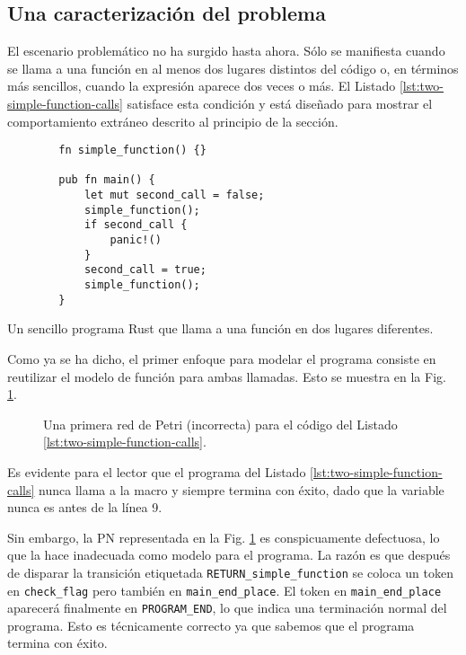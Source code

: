 \subsection{Una caracterización del problema}

El escenario problemático no ha surgido hasta ahora. Sólo se manifiesta cuando se llama a una
función en al menos dos lugares distintos del código o, en términos más sencillos, cuando la
expresión  aparece dos veces o más.
El Listado \ref{lst:two-simple-function-calls} satisface esta condición y
está diseñado para mostrar el comportamiento extráneo descrito al principio de la sección.

\begin{listing}[!htb]
    \begin{verbatim}
        fn simple_function() {}

        pub fn main() {
            let mut second_call = false;
            simple_function();
            if second_call {
                panic!()
            }
            second_call = true;
            simple_function();
        }
    \end{verbatim}
    \caption{Un sencillo programa Rust que llama a una función en dos lugares diferentes.}
    \label{lst:two-simple-function-calls}
\end{listing}

Como ya se ha dicho, el primer enfoque para modelar el programa consiste en reutilizar el
modelo de función para ambas llamadas. Esto se muestra en la Fig. \ref{fig:two-function-calls-incorrect-1}.

\begin{figure}[!htbp]
    \centering
    
    \caption{Una primera red de Petri (incorrecta) para el código del Listado \ref{lst:two-simple-function-calls}.}
    \label{fig:two-function-calls-incorrect-1}
\end{figure}

Es evidente para el lector que el programa del Listado \ref{lst:two-simple-function-calls}
nunca llama a la macro  y siempre termina con éxito,
dado que la variable  nunca es  antes de la línea 9.

Sin embargo, la \acrshort{PN} representada en la Fig. \ref{fig:two-function-calls-incorrect-1} es conspicuamente defectuosa,
lo que la hace inadecuada como modelo para el programa. La razón es que después de disparar la transición
etiquetada \texttt{RETURN\_simple\_function} se coloca un token en \texttt{check\_flag} pero también en
\texttt{main\_end\_place}. El token en \texttt{main\_end\_place} aparecerá finalmente en \texttt{PROGRAM\_END}, lo
que indica una terminación normal del programa.
Esto es técnicamente correcto ya que sabemos que el programa termina con éxito.

